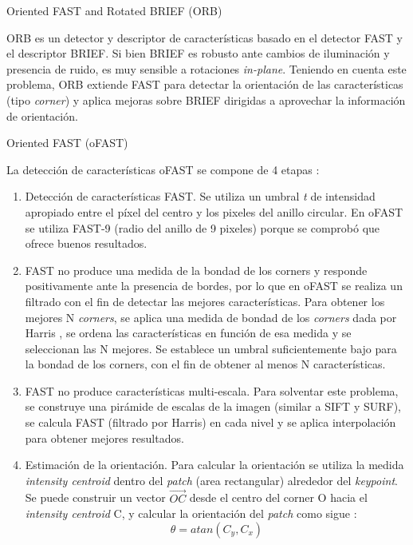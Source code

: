\begin{subsection}
{Oriented FAST and Rotated BRIEF (ORB)}

ORB es un detector y descriptor \cite{RubleeRKB11} de características basado en el detector FAST \cite{Rosten06machinelearning} y el descriptor BRIEF\cite{Calonder12}. Si bien BRIEF es robusto ante cambios de iluminación y presencia de ruido, es muy sensible a rotaciones \textit{\textsl{in-plane}}. Teniendo en cuenta este problema, ORB extiende FAST para detectar la orientación de las características (tipo \textit{\textsl{corner}}) y aplica mejoras sobre BRIEF dirigidas a aprovechar la información de orientación.

\begin{subsection}
{Oriented FAST (oFAST)}

La detección de características oFAST se compone de 4 etapas :
\begin{enumerate}

\item Detección de características FAST. Se utiliza un umbral \textsl{t} de intensidad apropiado entre el píxel del centro y los pixeles del anillo circular. En oFAST se utiliza FAST-9 (radio del anillo de 9 pixeles) porque se comprobó que ofrece buenos resultados.

\item FAST no produce una medida de la bondad de los corners y responde positivamente ante la presencia de bordes, por lo que en oFAST se realiza un filtrado con el fin de detectar las mejores características. Para obtener los mejores N \textit{\textsl{corners}}, se aplica una medida de bondad de los \textit{\textsl{corners}} dada por Harris \cite{Harris88alvey}, se ordena las características en función de esa medida y se seleccionan las N mejores. Se establece un umbral suficientemente bajo para la bondad de los corners, con el fin de obtener al menos N características.

\item FAST no produce características multi-escala. Para solventar este problema, se construye una pirámide de escalas de la imagen (similar a SIFT y SURF), se calcula FAST (filtrado por Harris) en cada nivel y se aplica interpolación para obtener mejores resultados. 

\item Estimación de la orientación. Para calcular la orientación se utiliza la medida \textit{\textsl{intensity centroid}} \cite{Rosin99measuringcorner} dentro del \textit{\textsl{patch}} (area rectangular) alrededor del \textit{\textsl{keypoint}}. Se puede construir un vector $\vec{OC}$ desde el centro del corner O hacia el \textit{\textsl{intensity centroid}} C, y calcular la orientación del \textit{\textsl{patch}} como sigue :
\begin{equation}
\theta = atan(C_{y}, C_{x})
\end{equation}


\end{enumerate}
\end{subsection}
\end{subsection}
